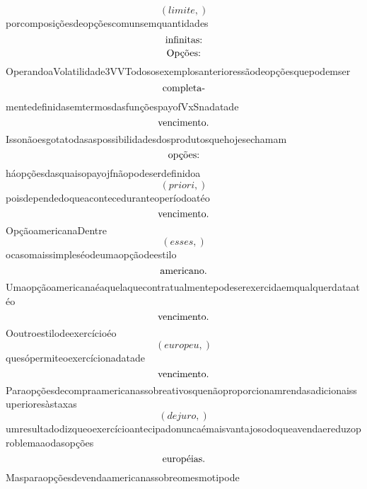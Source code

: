 \documentclass{article}
\begin{document}
\begin{equation}
\left( limite,\right)
\end{equation}porcomposiçõesdeopçõescomunsemquantidades\begin{equation}
$infinitas:$
\end{equation}\begin{equation}
$Opções:$
\end{equation}OperandoaVolatilidade3VVTodososexemplosanterioressãodeopçõesquepodemser\begin{equation}
$completa-$
\end{equation}mentedefinidasemtermosdasfunçõespayofVxSnadatade\begin{equation}
$vencimento.$
\end{equation}Issonãoesgotatodasaspossibilidadesdosprodutosquehojesechamam\begin{equation}
$opções:$
\end{equation}háopçõesdasquaisopayojfnãopodeserdefinidoa\begin{equation}
\left( priori,\right)
\end{equation}poisdependedoqueaconteceduranteoperíodoatéo\begin{equation}
$vencimento.$
\end{equation}OpçãoamericanaDentre\begin{equation}
\left( esses,\right)
\end{equation}ocasomaissimpleséodeumaopçãodeestilo\begin{equation}
$americano.$
\end{equation}Umaopçãoamericanaéaquelaquecontratualmentepodeserexercidaemqualquerdataatéo\begin{equation}
$vencimento.$
\end{equation}Ooutroestilodeexercícioéo\begin{equation}
\left( europeu,\right)
\end{equation}quesópermiteoexercícionadatade\begin{equation}
$vencimento.$
\end{equation}Paraopçõesdecompraamericanassobreativosquenãoproporcionamrendasadicionaissuperioresàstaxas\begin{equation}
\left( dejuro,\right)
\end{equation}umresultadodizqueoexercícioantecipadonuncaémaisvantajosodoqueavendaereduzoproblemaaodasopções\begin{equation}
$européias.$
\end{equation}Masparaopçõesdevendaamericanassobreomesmotipode\begin{equation}

\end{equation}
\end{document}
